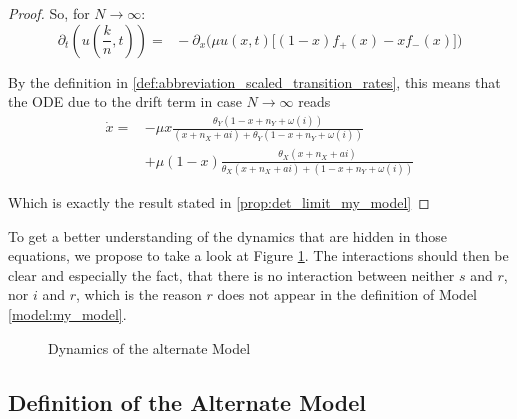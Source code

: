 \documentclass[12pt,a4paper,twoside]{article}
\begin{document}
\begin{proof}
	So, for $N \rightarrow \infty$:
	\begin{equation}
	\partial_t \left(u\left(\frac{k}{n}, t\right)\right)=\phantom{ll} -\partial_x\Big(\mu u(x,t)\big[(1-x)f_+(x) - xf_-(x)\big]\Big)
	\end{equation}
	
	By the definition in \eqref{def:abbreviation_scaled_transition_rates}, this means that the ODE due to the drift term in case $N \rightarrow \infty$ reads 
	\begin{align*}
	\dot{x} = &-\mu x\frac{\theta_Y(1-x+n_Y+\omega\left(i\right))}{(x+n_X+ai) + \theta_Y(1-x+n_Y+\omega\left(i\right))}\\
	\qquad&+ \mu \left(1-x\right)\frac{\theta_X (x+ n_X+ ai)}{\theta_X (x + n_X + ai) + (1-x + n_Y + \omega\left(i\right))}
	\end{align*}
	
	Which is exactly the result stated in \eqref{prop:det_limit_my_model}
\end{proof}

To get a better understanding of the dynamics that are hidden in those equations, we propose to take a look at Figure \ref{fig:my_model}. The interactions should then be clear and especially the fact, that there is no interaction between neither $s$ and $r$, nor $i$ and $r$, which is the reason $r$ does not appear in the definition of Model \ref{model:my_model}. 

\begin{figure}[h!]
	\centering
	\caption{Dynamics of the alternate Model}
	\label{fig:my_model}
	\def\svgwidth{450pt}
	
\end{figure}

\subsection{Definition of the Alternate Model}
\end{document}

